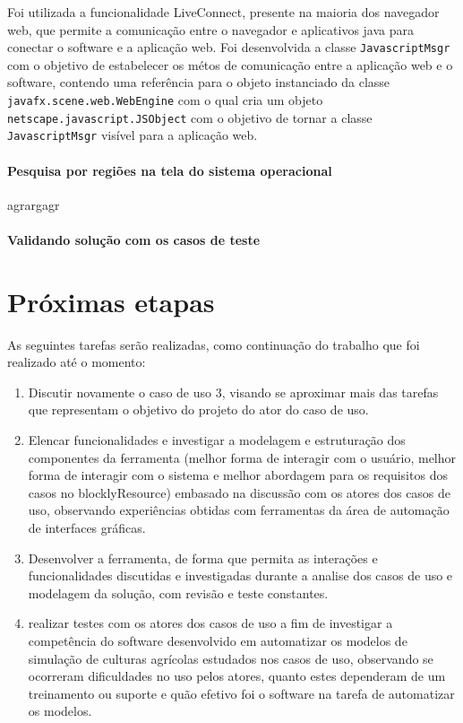 \documentclass[tg]{mdtufsm}
\begin{document}
    Foi utilizada a funcionalidade LiveConnect, presente na maioria dos navegador web, que permite a comunicação entre o navegador e aplicativos java para conectar o software e a aplicação web. Foi desenvolvida a classe \texttt{JavascriptMsgr} com o objetivo de estabelecer os métos de comunicação entre a aplicação web e o software, contendo uma referência para o objeto instanciado da classe \texttt{javafx.scene.web.WebEngine} com o qual cria um objeto \texttt{netscape.javascript.JSObject} com o objetivo de tornar a classe \texttt{JavascriptMsgr} visível para a aplicação web.

    \subsubsection {Pesquisa por regiões na tela do sistema operacional}

    
agrargagr
    \subsubsection {Validando solução com os casos de teste}



	\chapter{Próximas etapas}

	As seguintes tarefas serão realizadas, como continuação do trabalho que foi realizado até o momento:

	\begin{enumerate}

		\item Discutir novamente o caso de uso 3, visando se aproximar mais das tarefas que representam o objetivo do projeto do ator do caso de uso.

		\item Elencar funcionalidades e investigar a modelagem e estruturação dos componentes da ferramenta (melhor forma de interagir com o usuário, melhor forma de interagir com o sistema e melhor abordagem para os requisitos dos casos no blocklyResource) embasado na discussão com os atores dos casos de uso, observando experiências obtidas com ferramentas da área de automação de interfaces gráficas.

		\item Desenvolver a ferramenta, de forma que permita as interações e funcionalidades discutidas e investigadas durante a analise dos casos de uso e modelagem da solução, com revisão e teste constantes.

		\item realizar testes com os atores dos casos de uso a fim de investigar a competência do software desenvolvido em automatizar os modelos de simulação de culturas agrícolas estudados nos casos de uso, observando se ocorreram dificuldades no uso pelos atores, quanto estes dependeram de um treinamento ou suporte e quão efetivo foi o software na tarefa de automatizar os modelos.

	\end{enumerate}

	\setlength{\baselineskip}{\baselineskip}
	
	
\end{document}
